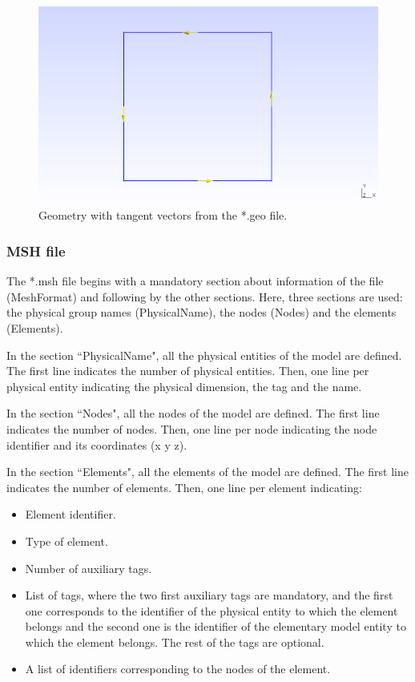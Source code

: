 \documentclass[A4]{article}
\begin{document}
\begin{figure}[h]
	\centering
	\includegraphics[scale = 0.5]{geometry2.png}
	\caption{Geometry with tangent vectors from the *.geo file.}
	\label{fig:geometry}
\end{figure}

\subsubsection{MSH file}

The *.msh file begins with a mandatory section about information of the file (MeshFormat) and following by the other sections. Here, three sections are used: the physical group names (PhysicalName), the nodes (Nodes) and the elements (Elements).

In the section ``PhysicalName", all the physical entities of the model are defined. The first line indicates the number of physical entities. Then, one line per physical entity indicating the physical dimension, the tag and the name.  
   
In the section ``Nodes", all the nodes of the model are defined. The first line indicates the number of nodes. Then, one line per node indicating the node identifier and its coordinates (x y z).

In the section ``Elements", all the elements of the model are defined. The first line indicates the number of elements. Then, one line per element indicating:

\begin{itemize}
	\item Element identifier.
	\item Type of element.
	\item Number of auxiliary tags.
	\item List of tags, where the two first auxiliary tags are mandatory, and the first one corresponds to the identifier of the physical entity to which the element belongs and the second one is the identifier of the elementary model entity to which the element belongs. The rest of the tags are optional.
	\item A list of identifiers corresponding to the nodes of the element.
\end{itemize}
\end{document}
